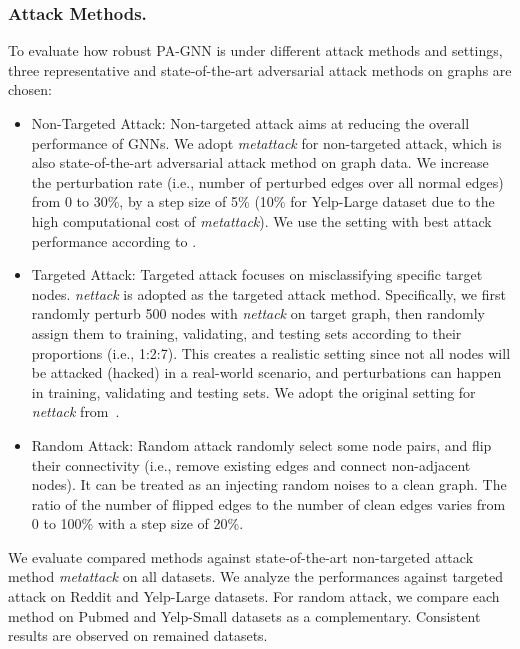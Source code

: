 \documentclass[sigconf]{acmart}
\newcommand{\our}{{PA-GNN}\xspace}
\begin{document}
\subsubsection{Attack Methods.}
To evaluate how robust \our is under different attack methods and settings, three representative and state-of-the-art adversarial attack methods on graphs are chosen:
\begin{itemize}[leftmargin=*]
    
    \item Non-Targeted Attack: Non-targeted attack aims at reducing the overall performance of GNNs.
    We adopt \textit{metattack} \cite{zugner2018adversarial2} for non-targeted attack, which is also state-of-the-art adversarial attack method on graph data. We increase the perturbation rate (i.e., number of perturbed edges over all normal edges) from 0 to 30\%, by a step size of 5\% (10\% for Yelp-Large dataset due to the high computational cost of \textit{metattack}). We use the setting with best attack performance according to \cite{zugner2018adversarial2}.
    \item Targeted Attack: Targeted attack focuses on misclassifying specific target nodes. \textit{nettack} \cite{zugner2018adversarial} is adopted as the targeted attack method. 
    Specifically, we first randomly perturb 500 nodes with \textit{nettack} on target graph, then randomly assign them to training, validating, and testing sets according to their proportions (i.e., 1:2:7). This creates a realistic setting since not all nodes will be attacked (hacked) in a real-world scenario, and perturbations can happen in training, validating and testing sets. We adopt the original setting for \textit{nettack} from~\cite{zugner2018adversarial}.
    \item Random Attack: Random attack randomly select some node pairs, and flip their connectivity (i.e., remove existing edges and connect non-adjacent nodes). It can be treated as an injecting random noises to a clean graph.
    The ratio of the number of flipped edges to the number of clean edges varies from 0 to 100\% with a step size of 20\%.
\end{itemize}
We evaluate compared methods against state-of-the-art non-targeted attack method \textit{metattack} on all datasets. We analyze the performances against targeted attack on Reddit and Yelp-Large datasets. For random attack, we compare each method on Pubmed and Yelp-Small datasets as a complementary. Consistent results are observed on remained datasets.
\end{document}
